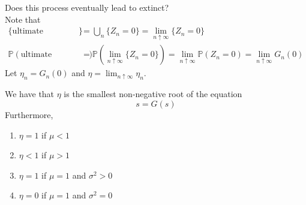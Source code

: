 \documentclass{huhtakm-template-book}
\newcommand{\prob}{\mathbb{P}}
\begin{document}
\begin{eg}
    Does this process eventually lead to extinct?\\
    Note that
    \begin{align*}
        \{\text{ultimate extinction}\}&=\bigcup_{n}\{Z_{n}=0\}=\lim_{n\uparrow\infty}\{Z_{n}=0\}\\
        \prob(\text{ultimate extinction})&=\prob\left(\lim_{n\uparrow\infty}\{Z_{n}=0\}\right)=\lim_{n\uparrow\infty}\prob(Z_{n}=0)=\lim_{n\uparrow\infty}G_{n}(0)
    \end{align*}
    Let $\eta_{n}=G_{n}(0)$ and $\eta=\lim_{n\uparrow\infty}\eta_{n}$.
\end{eg}
\begin{thm}
    We have that $\eta$ is the smallest non-negative root of the equation
    \begin{equation*}
        s=G(s)
    \end{equation*}
    Furthermore,
    \begin{enumerate}
        \item $\eta=1$ if $\mu<1$
        \item $\eta<1$ if $\mu>1$
        \item $\eta=1$ if $\mu=1$ and $\sigma^{2}>0$
        \item $\eta=0$ if $\mu=1$ and $\sigma^{2}=0$
    \end{enumerate}
\end{thm}
\end{document}
